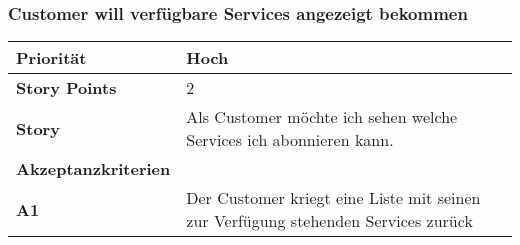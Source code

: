 \subsubsection{Customer will verfügbare Services angezeigt bekommen}
\begin{tabularx}{\linewidth}{l X}
  \textbf{Priorität} & Hoch\\
  \hline
  \textbf{Story Points} & 2\\
  \hline
  \textbf{Story}& Als Customer möchte ich sehen welche Services ich abonnieren kann.\\
  \hline
    \textbf{Akzeptanzkriterien} & \\
    \hline
  \textbf{A1} & Der Customer kriegt eine Liste mit seinen zur Verfügung stehenden Services zurück\\
  \hline
   \end{tabularx}
   